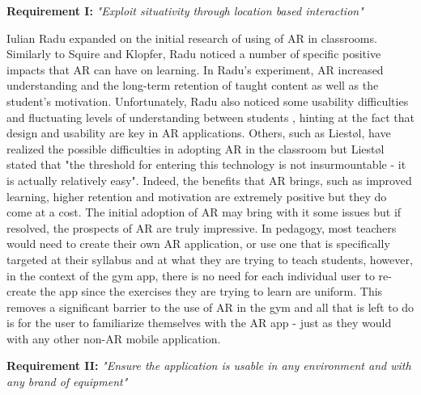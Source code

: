 \documentclass{l4proj}
\begin{document}
\textbf{Requirement I:} \textit{"Exploit situativity through location based interaction"}


Iulian Radu expanded on the initial research of using of AR in classrooms. Similarly to Squire and Klopfer, Radu noticed a number of specific positive impacts that AR can have on learning. In Radu's experiment, AR increased understanding and the long-term retention of taught content as well as the student's motivation\cite{radu_why_2012}. Unfortunately, Radu also noticed some usability difficulties and fluctuating levels of understanding between students \cite{radu_why_2012}, hinting at the fact that design and usability are key in AR applications. Others, such as Liestøl, have realized the possible difficulties in adopting AR in the classroom but Liestøl stated that "the threshold for entering this technology is not insurmountable - it is actually relatively easy"\cite{liestol_learning_2011}. Indeed, the benefits that AR brings, such as improved learning, higher retention and motivation are extremely positive but they do come at a cost. The initial adoption of AR may bring with it some issues but if resolved, the prospects of AR are truly impressive. In  pedagogy, most teachers would need to create their own AR application, or use one that is specifically targeted at their syllabus and at what they are trying to teach students, however, in the context of the gym app, there is no need for each individual user to re-create the app since the exercises they are trying to learn are uniform. This removes a significant barrier to the use of AR in the gym and all that is left to do is for the user to familiarize themselves with the AR app - just as they would with any other non-AR mobile application. 

\textbf{Requirement II:} \textit{"Ensure the application is usable in any environment and with any brand of equipment"}
\end{document}
